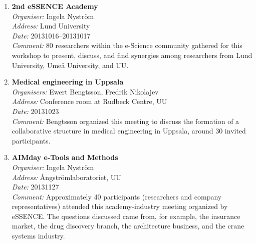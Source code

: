 \begin{enumerate}
\item 
{\bf 2nd eSSENCE Academy}~\\
{\em Organiser:} Ingela Nystr\"{o}m~\\
{\em Address:} Lund University~\\
{\em Date:} 20131016--20131017~\\
{\em Comment:} 80 researchers within the e-Science community gathered for this workshop to present, discuss, and find synergies among researchers from Lund University, Ume{\aa} University, and UU.

\item 
{\bf Medical engineering in Uppsala}~\\
{\em Organisers:} Ewert Bengtsson, Fredrik Nikolajev~\\
{\em Address:} Conference room at Rudbeck Centre, UU~\\
{\em Date:} 20131023~\\
{\em Comment:} Bengtsson organized this meeting to discuss the formation of a collaborative structure in medical engineering in Uppsala, around 30 invited participants.

\item 
{\bf AIMday e-Tools and Methods}~\\
{\em Organiser:} Ingela Nystr\"{o}m~\\
{\em Address:} {\AA}ngstr\"{o}mlaboratoriet, UU~\\
{\em Date:} 20131127~\\
{\em Comment:} Approximately 40 participants (researchers and company representatives) attended this academy-industry meeting organized by eSSENCE. The questions discussed came from, for example, the insurance market, the drug discovery branch, the architecture business, and the crane systems industry.

\end{enumerate}

